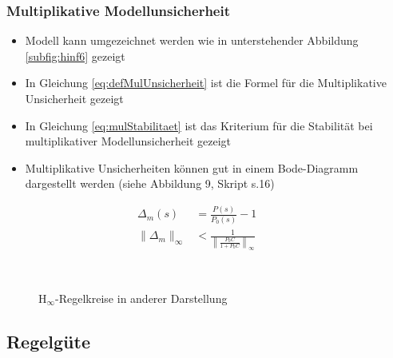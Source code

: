\subsubsection{Multiplikative Modellunsicherheit}
\begin{itemize}
	\item Modell kann umgezeichnet werden wie in unterstehender Abbildung \ref{subfig:hinf6} gezeigt
	\item In Gleichung \ref{eq:defMulUnsicherheit} ist die Formel für die Multiplikative Unsicherheit gezeigt
	\item In Gleichung \ref{eq:mulStabilitaet} ist das Kriterium für die Stabilität bei multiplikativer Modellunsicherheit gezeigt
	\item Multiplikative Unsicherheiten können gut in einem Bode-Diagramm dargestellt werden (siehe Abbildung 9, Skript s.16)
\end{itemize}
\begin{align}
\label{eq:defMulUnsicherheit}
\Delta_m(s) &= \frac{P(s)}{P_0(s)}-1\\
\label{eq:mulStabilitaet}
\lVert\Delta_m\rVert_\infty &< \frac{1}{\left\lVert\frac{P_0C}{1+P_0C}\right\rVert_\infty} \qquad 
\end{align}

\begin{figure}[!h]
	\centering
	\hspace{0.2\linewidth}
	\\
	\caption{ $\text{H}_\infty$-Regelkreise in anderer Darstellung}
	\label{fig:hinf4}
\end{figure}


\subsection{Regelgüte}

